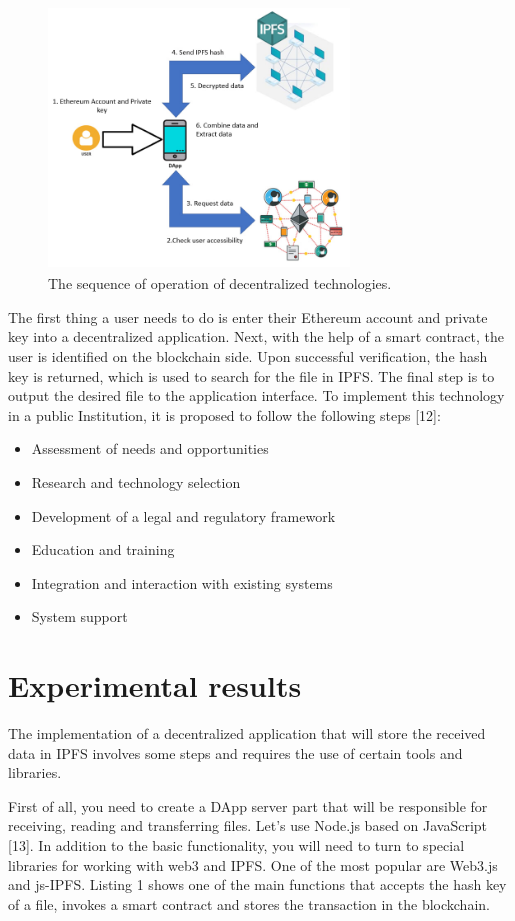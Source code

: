 \documentclass[10pt,conference,a4paper]{IEEEtran_EDM}
\begin{document}
\begin{figure}[htbp]
\includegraphics[width=8cm, height=7cm]{fig2.png}
\caption{The sequence of operation of decentralized technologies.}
\label{fig}
\end{figure}
The first thing a user needs to do is enter their Ethereum account and private key into a decentralized application. Next, with the help of a smart contract, the user is identified on the blockchain side. Upon successful verification, the hash key is returned, which is used to search for the file in IPFS. The final step is to output the desired file to the application interface. 
To implement this technology in a public Institution, it is proposed to follow the following steps [12]:
\begin{itemize}
\item Assessment of needs and opportunities
\item  Research and technology selection
\item Development of a legal and regulatory framework
\item Education and training
\item Integration and interaction with existing systems
\item System support
\end{itemize}

\section{Experimental results}
The implementation of a decentralized application that will store the received data in IPFS involves some steps and requires the use of certain tools and libraries. 

First of all, you need to create a DApp server part that will be responsible for receiving, reading and transferring files. Let's use Node.js based on JavaScript [13]. In addition to the basic functionality, you will need to turn to special libraries for working with web3 and IPFS. One of the most popular are Web3.js and js-IPFS. Listing 1 shows one of the main functions that accepts the hash key of a file, invokes a smart contract and stores the transaction in the blockchain.
\end{document}
